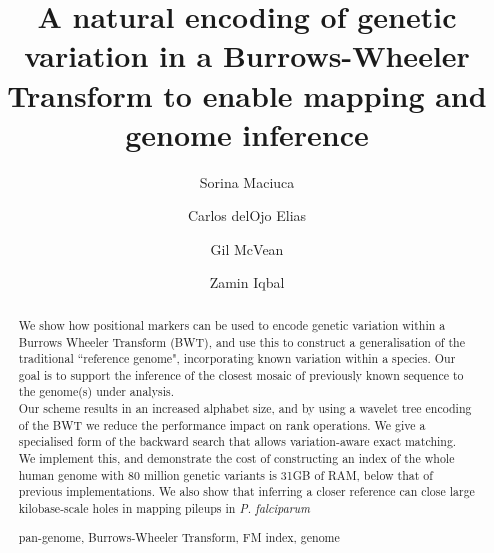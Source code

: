 \documentclass[runningheads,a4paper]{llncs}
\newcommand{\keywords}[1]{\par\addvspace\baselineskip
\noindent\keywordname\enspace\ignorespaces#1}
\begin{document}
\mainmatter  %

\title{A natural encoding of genetic variation in a Burrows-Wheeler Transform  to enable mapping and genome inference}


%
%
\author{Sorina Maciuca%
\and Carlos delOjo Elias\and Gil McVean \and Zamin Iqbal}
%



\maketitle


\begin{abstract}
We show how positional markers can be used to encode genetic variation within a Burrows Wheeler Transform (BWT), and use this to construct a generalisation of the traditional ``reference genome", incorporating known variation within a species. Our goal is to support the inference of the closest mosaic of previously known sequence to the genome(s) under analysis.\\ Our scheme results in an increased alphabet size, and by using a wavelet tree encoding of the BWT we reduce the performance impact on rank operations. We give a specialised form of the backward search that allows variation-aware exact matching. We implement this, and demonstrate the cost of constructing an index of the whole human genome with 80 million genetic variants is 31GB of RAM,  below that of previous implementations. We also show that inferring a closer reference can close large kilobase-scale holes in mapping pileups in \textit{P. falciparum}
\keywords{pan-genome, Burrows-Wheeler Transform, FM index, genome}
\end{abstract}
\end{document}
